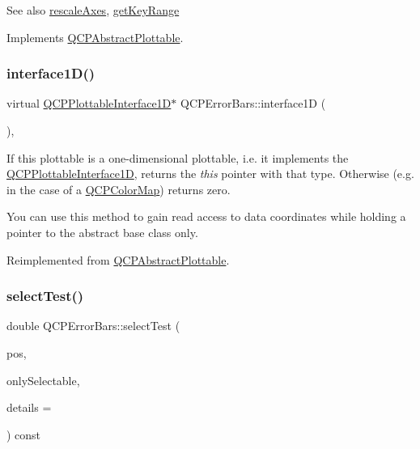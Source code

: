 \begin{DoxySeeAlso}{See also}
\hyperlink{classQCPAbstractPlottable_a1491c4a606bccd2d09e65e11b79eb882}{rescale\+Axes}, \hyperlink{classQCPErrorBars_a6cac828a430d66ac77a167549d01d212}{get\+Key\+Range} 
\end{DoxySeeAlso}


Implements \hyperlink{classQCPAbstractPlottable_a4de773988b21ed090fddd27c6a3a3dcb}{Q\+C\+P\+Abstract\+Plottable}.

\mbox{\label{classQCPErrorBars_a0b6fbf3a943b4241ee485d066cc8562a}} 
\subsubsection{\texorpdfstring{interface1\+D()}{interface1D()}}
{\footnotesize\ttfamily virtual \hyperlink{classQCPPlottableInterface1D}{Q\+C\+P\+Plottable\+Interface1D}$\ast$ Q\+C\+P\+Error\+Bars\+::interface1D (\begin{DoxyParamCaption}{ }\end{DoxyParamCaption})\hspace{0.3cm}{\ttfamily [inline]}, {\ttfamily [virtual]}}

If this plottable is a one-\/dimensional plottable, i.\+e. it implements the \hyperlink{classQCPPlottableInterface1D}{Q\+C\+P\+Plottable\+Interface1D}, returns the {\itshape this} pointer with that type. Otherwise (e.\+g. in the case of a \hyperlink{classQCPColorMap}{Q\+C\+P\+Color\+Map}) returns zero.

You can use this method to gain read access to data coordinates while holding a pointer to the abstract base class only. 

Reimplemented from \hyperlink{classQCPAbstractPlottable_a81fd9fd5c4f429c074785e2eb238a8e7}{Q\+C\+P\+Abstract\+Plottable}.

\mbox{\label{classQCPErrorBars_ac1b6675ef43e32547a3cbcf7b7ac46ed}} 
\subsubsection{\texorpdfstring{select\+Test()}{selectTest()}}
{\footnotesize\ttfamily double Q\+C\+P\+Error\+Bars\+::select\+Test (\begin{DoxyParamCaption}\item[{const Q\+PointF \&}]{pos,  }\item[{bool}]{only\+Selectable,  }\item[{Q\+Variant $\ast$}]{details = {} }\end{DoxyParamCaption}) const\hspace{0.3cm}{\ttfamily [virtual]}}

